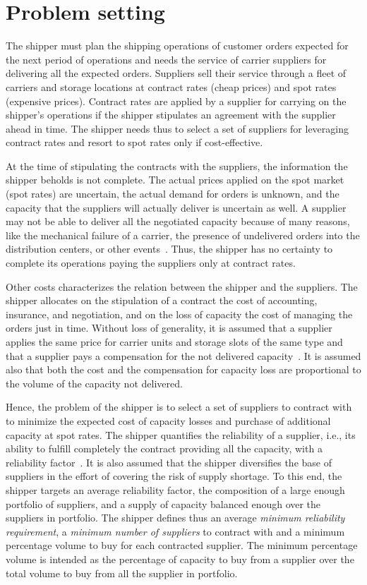 \documentclass[a4paper,11pt]{article}
\begin{document}
	\section{Problem setting}\label{s:probdesc}
	The shipper must plan the shipping operations of customer orders expected for the next period of operations and needs the service of carrier suppliers for delivering all the expected orders.
	Suppliers sell their service through a fleet of carriers and storage locations at contract rates (cheap prices) and spot rates (expensive prices).
	Contract rates are applied by a supplier for carrying on the shipper's operations if the shipper stipulates an agreement with the supplier ahead in time.
	The shipper needs thus to select a set of suppliers for leveraging contract rates and resort to spot rates only if cost-effective.
	
	At the time of stipulating the contracts with the suppliers, the information the shipper beholds is not complete.
	The actual prices applied on the spot market (spot rates) are uncertain, the actual demand for orders is unknown, and the capacity that the suppliers will actually deliver is uncertain as well.
	A supplier may not be able to deliver all the negotiated capacity because of many reasons, like the mechanical failure of a carrier, the presence of undelivered orders into the distribution centers, or other events~\cite{crainic2024capacity}.
	Thus, the shipper has no certainty to complete its operations paying the suppliers only at contract rates.

	Other costs characterizes the relation between the shipper and the suppliers.
	The shipper allocates on the stipulation of a contract the cost of accounting, insurance, and negotiation, and on the loss of capacity the cost of managing the orders just in time.
	Without loss of generality, it is assumed that a supplier applies the same price for carrier units and storage slots of the same type and that a supplier pays a compensation for the not delivered capacity~\cite{Guo2011}.
	It is assumed also that both the cost and the compensation for capacity loss are proportional to the volume of the capacity not delivered.
	
	Hence, the problem of the shipper is to select a set of suppliers to contract with to minimize the expected cost of capacity losses and purchase of additional capacity at spot rates.
	The shipper quantifies the reliability of a supplier, {i.e.}, its ability to fulfill completely the contract providing all the capacity, with a reliability factor~\cite{Guo2011}.
	It is also assumed that the shipper diversifies the base of suppliers in the effort of covering the risk of supply shortage.
	To this end, the shipper targets an average reliability factor, the composition of a large enough portfolio of suppliers, and a supply of capacity balanced enough over the suppliers in portfolio.
	The shipper defines thus an average \textit{minimum reliability requirement}, a \textit{minimum number of suppliers} to contract with and a minimum percentage volume to buy for each contracted supplier.
	The minimum percentage volume is intended as the percentage of capacity to buy from a supplier over the total volume to buy from all the supplier in portfolio.
	
\end{document}

